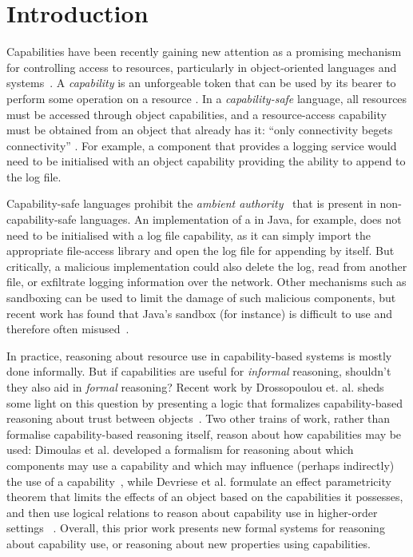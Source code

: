 \section{Introduction}

Capabilities have been recently gaining new attention as a promising
mechanism for controlling access to resources, particularly in
object-oriented languages and
systems~\cite{miller03,drossopoulou07,dimoulas14,devriese16}.  A
\textit{capability} is an unforgeable token that can be used by its
bearer to perform some operation on a resource \cite{dennis66}.  In a
\textit{capability-safe} language, all resources must be accessed
through object capabilities, and a resource-access capability must be
obtained from an object that already has it: ``only connectivity
begets connectivity'' \cite{miller03}.  For example, a 
component that provides a logging service would need to be initialised
with an object capability providing the ability to append to the log
file.

Capability-safe languages prohibit the \textit{ambient
  authority}~\cite{miller06} that is present in non-capability-safe
languages. An implementation of a  in Java, for example,
does not need to be initialised with a log file capability, as it can simply
import the appropriate file-access library and open the log file for
appending by itself. But critically, a malicious implementation could also
delete the log, read from another file, or exfiltrate logging information
over the network.  Other mechanisms such as sandboxing can be used
to limit the damage of such malicious components, but recent work has
found that Java's sandbox (for instance) is difficult to use and
therefore often misused~\cite{coker15,maass16}.

In practice, reasoning about resource use in capability-based systems
is mostly done informally.
But if capabilities are useful for \textit{informal} reasoning,
shouldn't they also aid in \textit{formal} reasoning?  Recent work by Drossopoulou et. al. sheds some light on this question by presenting a logic that
formalizes capability-based reasoning about trust between
objects~\cite{drossopoulou07}.  Two other trains of work, rather than
formalise capability-based reasoning itself, reason about how
capabilities may be used: Dimoulas et al. developed a formalism for
reasoning about which components may use a capability and which may
influence (perhaps indirectly) the use of a
capability~\cite{dimoulas14}, while  Devriese et al. formulate an effect
parametricity theorem that limits the effects of an object based on
the capabilities it possesses, and then use logical relations to
reason about capability use in higher-order settings~\cite{devriese16}
.  Overall, this prior work presents new formal systems for reasoning
about capability use, or reasoning about new properties using
capabilities.

